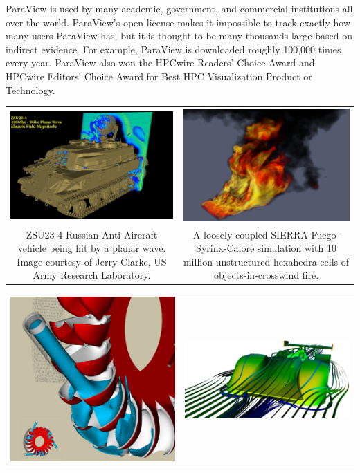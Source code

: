 ParaView is used by many academic, government, and commercial institutions
all over the world.  ParaView's open license makes it impossible to track
exactly how many users ParaView has, but it is thought to be many thousands
large based on indirect evidence.  For example, ParaView is downloaded
roughly 100,000 times every year.  ParaView also won the
HPCwire Readers' Choice Award and HPCwire Editors' Choice Award for Best
HPC Visualization Product or Technology.

\begin{inlinefig}
  \begin{tabular}{cc}
    \includegraphics[width=.457\linewidth]{images/Tank} &
    \includegraphics[width=0.443\linewidth]{images/Fire} \\
    \parbox[t]{.457\linewidth}{\footnotesize ZSU23-4 Russian Anti-Aircraft
      vehicle being hit by a planar wave.  Image courtesy of Jerry Clarke,
      US Army Research Laboratory.} &
    \parbox[t]{0.443\linewidth}{\footnotesize A loosely coupled
      SIERRA-Fuego-Syrinx-Calore simulation with 10 million unstructured
      hexahedra cells of objects-in-crosswind fire.}
  \end{tabular}
  \begin{tabular}{cc}
    \includegraphics[width=.29\linewidth]{images/PeltonTurbine} &
    \includegraphics[width=.61\linewidth]{images/LeMansCar} \\

\end{tabular}
\end{inlinefig}
